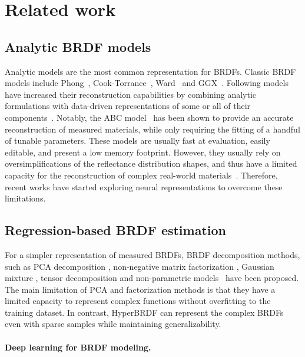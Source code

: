 \section{Related work}
\label{sec:relatedwork}


\subsection{Analytic BRDF models}
\label{hyperbrdf-RW}
Analytic models are the most common representation for BRDFs. Classic BRDF models include Phong~\cite{blinn77}, Cook-Torrance~\cite{cooktorrance1982}, Ward~\cite{ward1992} and GGX~\cite{walter2007microfacet}. Following models have increased their reconstruction capabilities by combining analytic formulations with data-driven representations of some or all of their components~\cite{dupuy2015, ashikhmin2007, bagher2016}. Notably, the ABC model~\cite{low2012} has been shown to provide an accurate reconstruction of measured materials, while only requiring the fitting of a handful of tunable parameters. These models are usually fast at evaluation, easily editable, and present a low memory footprint. However, they usually rely on oversimplifications of the reflectance distribution shapes, and thus have a limited capacity for the reconstruction of complex real-world materials~\cite{ngan2005, guarnera2016}. Therefore, recent works have started exploring neural representations to overcome these limitations.



\subsection{Regression-based BRDF estimation}
For a simpler representation of measured BRDFs, BRDF decomposition methods, such as PCA decomposition 
\cite{matusik2003data, nielsen2015optimal, serrano2018intuitive}, non-negative matrix factorization \cite{lawrence2004efficient, lawrence2006inverse}, Gaussian mixture \cite{sun2007interactive}, tensor decomposition \cite{bilgili2011general, tongbuasirilai2020compact} 
and non-parametric models~\cite{bagher2016non} have been proposed. The main limitation of PCA and factorization methods is  that they have a limited capacity to represent complex functions without overfitting to the training dataset. In contrast, HyperBRDF can represent the complex BRDFs even with sparse samples while maintaining generalizability.


\paragraph{Deep learning for BRDF modeling.}

